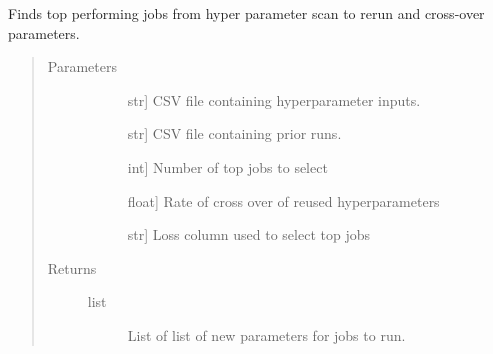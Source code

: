 \documentclass[letterpaper,10pt,english]{sphinxmanual}
\begin{document}
\begin{fulllineitems}
\label{\detokenize{index:methylnet.hyperparameter_scans.find_top_jobs}}
Finds top performing jobs from hyper parameter scan to rerun and cross-over parameters.
\begin{quote}\begin{description}
\item[{Parameters}] \leavevmode\begin{description}
\item[{}] \leavevmode{[}str{]}
CSV file containing hyperparameter inputs.

\item[{}] \leavevmode{[}str{]}
CSV file containing prior runs.

\item[{}] \leavevmode{[}int{]}
Number of top jobs to select

\item[{}] \leavevmode{[}float{]}
Rate of cross over of reused hyperparameters

\item[{}] \leavevmode{[}str{]}
Loss column used to select top jobs

\end{description}

\item[{Returns}] \leavevmode\begin{description}
\item[{list}] \leavevmode
List of list of new parameters for jobs to run.

\end{description}

\end{description}\end{quote}

\end{fulllineitems}

\end{document}
